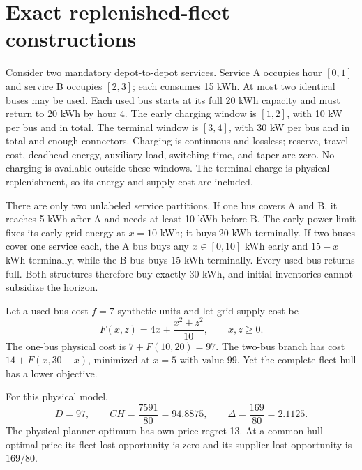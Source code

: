 \section{Exact replenished-fleet constructions}\label{sec:exact}

Consider two mandatory depot-to-depot services.  Service A occupies hour
$[0,1]$ and service B occupies $[2,3]$; each consumes 15 kWh.  At most two
identical buses may be used.  Each used bus starts at its full 20 kWh
capacity and must return to 20 kWh by hour 4.  The early charging window is
$[1,2]$, with 10 kW per bus and in total.  The terminal window is $[3,4]$,
with 30 kW per bus and in total and enough connectors.  Charging is
continuous and lossless; reserve, travel cost, deadhead energy, auxiliary
load, switching time, and taper are zero.  No charging is available outside
these windows.  The terminal charge is physical replenishment, so its energy
and supply cost are included.

There are only two unlabeled service partitions.  If one bus covers A and B,
it reaches 5 kWh after A and needs at least 10 kWh before B.  The early
power limit fixes its early grid energy at $x=10$ kWh; it buys 20 kWh
terminally.  If two buses cover one service each, the A bus buys any
$x\in[0,10]$ kWh early and $15-x$ kWh terminally, while the B bus buys 15
kWh terminally.  Every used bus returns full.  Both structures therefore
buy exactly 30 kWh, and initial inventories cannot subsidize the horizon.

Let a used bus cost $f=7$ synthetic units and let grid supply cost be
\begin{equation}\label{eq:exact-supply}
 F(x,z)=4x+\frac{x^2+z^2}{10},\qquad x,z\geq0.
\end{equation}
The one-bus physical cost is $7+F(10,20)=97$.  The two-bus branch has cost
$14+F(x,30-x)$, minimized at $x=5$ with value 99.  Yet the complete-fleet
hull has a lower objective.

\begin{proposition}
\label{prop:exact-nominal}
For this physical model,
\begin{equation}\label{eq:exact-values}
 D=97,\qquad CH=\frac{7591}{80}=94.8875,\qquad
 \Delta=\frac{169}{80}=2.1125.
\end{equation}
The physical planner optimum has own-price regret 13.  At a common
hull-optimal price its fleet lost opportunity is zero and its supplier lost
opportunity is $169/80$.
\end{proposition}

